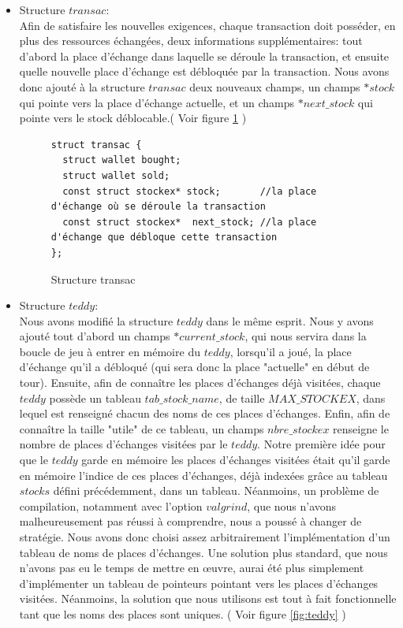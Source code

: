 \documentclass{article}
\begin{document}
\begin{itemize}
    \item Structure $transac$: \\
  Afin de satisfaire les nouvelles exigences, chaque transaction doit posséder, en plus des ressources échangées, deux informations supplémentaires: tout d'abord la place d'échange dans laquelle se déroule la transaction, et ensuite quelle nouvelle place d'échange est débloquée par la transaction. Nous avons donc ajouté à la structure $transac$ deux nouveaux champs, un champs $*stock$ qui pointe vers la place d'échange actuelle, et un champs $*next\_stock$ qui pointe vers le stock déblocable.( Voir figure \ref{fig:transac} )
  \begin{figure}
      \centering
\begin{lstlisting}
struct transac {
  struct wallet bought;
  struct wallet sold;
  const struct stockex* stock;       //la place d'échange où se déroule la transaction 
  const struct stockex*  next_stock; //la place d'échange que débloque cette transaction
};  
\end{lstlisting}
      \caption{Structure transac}
      \label{fig:transac}
  \end{figure}
  \item Structure $teddy$:\\
Nous avons modifié la structure $teddy$ dans le même esprit. Nous y avons ajouté tout d'abord un champs $*current\_stock$, qui nous servira dans la boucle de jeu à entrer en mémoire du $teddy$, lorsqu'il a joué, la place d'échange qu'il a débloqué (qui sera donc la place "actuelle" en début de tour). Ensuite, afin de connaître les places d'échanges déjà visitées, chaque $teddy$ possède un tableau $tab\_stock\_name$, de taille $MAX\_STOCKEX$, dans lequel est renseigné chacun des noms de ces places d'échanges. Enfin, afin de connaître la taille "utile" de ce tableau, un champs $nbre\_stockex$ renseigne le nombre de places d'échanges visitées par le $teddy$. Notre première idée pour que le $teddy$ garde en mémoire les places d'échanges visitées était qu'il garde en mémoire l'indice de ces places d'échanges, déjà indexées grâce au tableau $stocks$ défini précédemment, dans un tableau. Néanmoins, un problème de compilation, notamment avec l'option $valgrind$, que nous n'avons malheureusement pas réussi à comprendre, nous a poussé à changer de stratégie. Nous avons donc choisi assez arbitrairement l'implémentation d'un tableau de noms de places d'échanges. Une solution plus standard, que nous n'avons pas eu le temps de mettre en \oe uvre, aurai été plus simplement d'implémenter un tableau de pointeurs pointant vers les places d'échanges visitées. Néanmoins, la solution que nous utilisons est tout à fait fonctionnelle tant que les noms des places sont uniques. ( Voir figure \ref{fig:teddy} ) 

\end{itemize}
\end{document}
